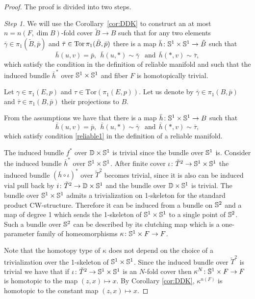 \documentclass{amsart}
\begin{document}
\begin{proof} The proof is divided into two steps.

\noindent\textit{Step 1.} 
We will use the Corollary~\ref{cor:DDK} 
to construct 
an at most $n=n(F,\dim B)$-fold cover $\widetilde B\to B$ 
such that for any two elements $\bar\gamma\in \pi_1(\tilde B,\bar p)$ and $\bar\tau\in \Tor \pi_1(\tilde B,\bar p)$ there is a map 
$\bar h\colon {\Bbb S}^1\times {\Bbb S}^1\to \tilde B$ such that 
$$\bar h(u,v)=\bar p,\ \ 
\bar h(u,*)\sim\bar\gamma\ \ \text{ and}\ \ 
\bar h(*,v)\sim\bar\tau,$$
which satisfy the condition in the  definition of reliable manifold and such that the induced bundle $\bar h^*$ over ${\Bbb S}^1\times {\Bbb S}^1$ and fiber $F$ is homotopically trivial.

Let $\gamma\in \pi_1(E,p)$ and $\tau\in \mathrm{Tor}(\pi_1(E,p))$. 
Let us denote by $\bar\gamma\in \pi_1(B,\bar p)$ and 
$\bar\tau\in \pi_1(B,\bar p)$ their projections to $B$.

From the assumptions we have 
that there is a map 
$\bar h\colon {\Bbb S}^1\times {\Bbb S}^1\to B$ such that 
$$\bar h(u,v)=\bar p,\ \ 
\bar h(u,*)\sim\bar\gamma\ \ \text{ and}\ \ 
\bar h(*,v)\sim\bar\tau,$$
which satisfy condition \eqref{reliable1} in the definition of a reliable manifold.

The  induced bundle $f^*$ over $\DD\times {\Bbb S}^1$ 
is trivial since the bundle over ${\Bbb S}^1$ is. 
Consider the  induced bundle $\bar h^*$ over ${\Bbb S}^1\times {\Bbb S}^1$. 
After finite cover $\iota\colon \tilde T^2\to {\Bbb S}^1\times {\Bbb S}^1$ the induced bundle 
$(\bar h \circ \iota)^*$ over $\tilde T^2$ becomes trivial, since it is also can be induced vial pull back by $i\colon \tilde T^2\to \DD\times {\Bbb S}^1$ and the bundle over $ \DD\times \S^1$ is trivial. 
The bundle over ${\Bbb S}^1\times {\Bbb S}^1$ admits a trivialization on 1-skeleton 
for the standard  product CW-structure. 
Therefore it can be induced from a bundle on ${\Bbb S}^2$ and a map of degree 1 
which sends the  1-skeleton of ${\Bbb S}^1\times {\Bbb S}^1$ to a single point of ${\Bbb S}^2$. 
Such a bundle over $\S^2$ can be described by its clutching map which is a one-parameter family of homeomorphisms 
$\kappa\colon {\Bbb S}^1\times F\to F$.

Note that the  homotopy type of $\kappa$ does not depend on the choice of a
trivialization over the 1-skeleton of ${\Bbb S}^1\times {\Bbb S}^1$.
Since the induced bundle over $\tilde T^2$ is trivial we have that 
if $ \iota\colon  \tilde T^2\to {\Bbb S}^1\times {\Bbb S}^1$ is an $N$-fold cover then 
$\kappa^N\colon {\Bbb S}^1\times F\to F$ is homotopic to the map $(z,x)\mapsto x$.
By Corollary \ref{cor:DDK},  $\kappa^{n(F)}$ 
is homotopic to the constant map $(z,x)\mapsto x$.


\end{proof}
\end{document}
